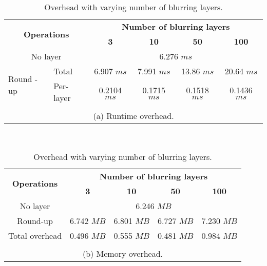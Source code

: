 \begin{table}
\scriptsize
\centering

\bgroup
\def\arraystretch{1.15}%

\begin{tabular}{|l|l|c|c|c|c|}
\hline
\multicolumn{2}{|c|}{\multirow{2}{*}{\bf Operations}} & 
\multicolumn{4}{c|}{\bf Number of blurring layers} \\\cline{3-6}
\multicolumn{2}{|c|}{} & {\bf 3} & {\bf 10} & {\bf 50} & {\bf 100}\\\hline

\multicolumn{2}{|c|}{No layer} & \multicolumn{4}{c|}{6.276 $ms$} \\\hline


\multirow{2}{*}{Round -up} & Total & 6.907 $ms$ & 7.991 $ms$  & 13.86 $ms$ & 20.64 $ms$ \\ \cline{2-6}
& Per-layer & 0.2104 $ms$ & 0.1715 $ms$ & 0.1518 $ms$ & 0.1436 $ms$ \\ \hline
\multicolumn{6}{c}{\vspace{-0.1cm}}\\

\multicolumn{6}{c}{\small (a) Runtime overhead.} \\
\end{tabular}\\\vspace{0.25cm}


\begin{tabular}{|l|l|c|c|c|c|}
\hline
\multicolumn{2}{|c|}{\multirow{2}{*}{\bf Operations}} & 
\multicolumn{4}{c|}{\bf Number of blurring layers} \\\cline{3-6}
\multicolumn{2}{|c|}{} & {\bf 3} & {\bf 10} & {\bf 50} & {\bf 100}\\\hline

\multicolumn{2}{|c|}{No layer} & \multicolumn{4}{c|}{6.246 $MB$} \\\hline

\multicolumn{2}{|c|}{Round-up} & 6.742 $MB$ & 6.801 $MB$ & 6.727 $MB$ & 7.230 $MB$ \\\hline

\multicolumn{2}{|c|}{Total overhead} & 0.496 $MB$ & 0.555 $MB$ & 0.481 $MB$ & 0.984 $MB$ \\\hline
\multicolumn{6}{c}{\vspace{-0.1cm}}\\

\multicolumn{6}{c}{\small (b) Memory overhead.} \\
\end{tabular}

\egroup

\caption{\small Overhead with varying number of blurring layers.}
\label{tab:overhead}
\end{table}


